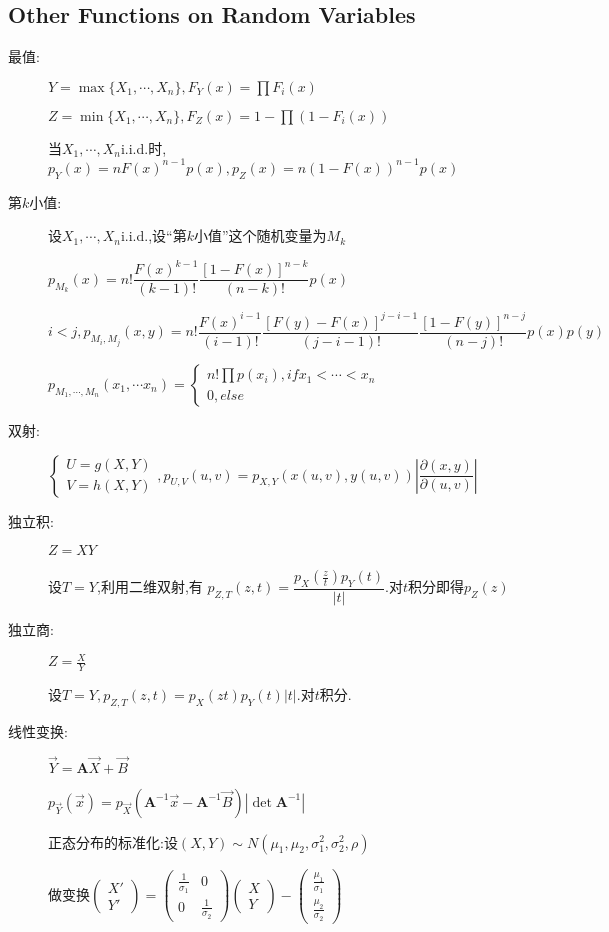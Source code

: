 \subsection{Other Functions on Random Variables}
\begin{description}
  \item[最值:]
    $ Y=\max\{ X_1,\cdots, X_n\}, F_Y(x) = \prod{F_i(x)}$

    $ Z = \min\{ X_1,\cdots ,X_n\}, F_Z(x) = 1-\prod{(1-F_i(x))}$

    当$ X_1,\cdots ,X_n$i.i.d.时,$ p_Y(x)=nF(x)^{n-1}p(x), p_Z(x)=n(1-F(x))^{n-1}p(x)$
  \item[第$ k$小值:]设$ X_1,\cdots ,X_n$i.i.d.,设``第$ k$小值''这个随机变量为$ M_k$

      $ p_{M_k}(x)=n!\dfrac{F(x)^{k-1}}{(k-1)!}\dfrac{[1-F(x)]^{n-k}}{(n-k)!}p(x)$

      $i<j, p_{M_i,M_j}(x,y)=n!\dfrac{F(x)^{i-1}}{(i-1)!}\dfrac{[F(y)-F(x)]^{j-i-1}}{(j-i-1)!}\dfrac{[1-F(y)]^{n-j}}{(n-j)!}p(x)p(y)$

      $ p_{M_1,\cdots ,M_n}(x_1,\cdots x_n)=\begin{cases}n!\prod{p(x_i)},if x_1<\cdots <x_n\\0,else \end{cases}$
  \item[双射:]
   $ \begin{cases}U=g(X,Y)\\V=h(X,Y)\end{cases},p_{U,V}(u,v) = p_{X,Y}(x(u,v),y(u,v))|\dfrac{\partial(x,y)}{\partial(u,v)}|$

  \item[独立积:]$ Z=XY$\hfill

   设$T = Y$,利用二维双射,有 $p_{Z,T}(z,t) = \dfrac{p_X(\frac{z}{t})p_Y(t)}{|t|}$.对$ t$积分即得$ p_Z(z)$

 \item[独立商:]$ Z=\frac{X}{Y}$\hfill

   设$ T=Y,p_{Z,T}(z,t)=p_X(zt)p_Y(t)|t|.$对$ t$积分.

 \item[线性变换:]$ \vec Y = \mathbf{A} \vec X + \vec B$

   $ p_{\vec Y}(\vec x)=p_{\vec X}(\mathbf{A}^{-1}\vec x-\mathbf{A}^{-1}\vec B)|\det \mathbf{A}^{-1}|$

   正态分布的标准化:设$(X,Y)\sim N(\mu_1,\mu_2,\sigma_1^2,\sigma_2^2,\rho) $

   做变换$\begin{pmatrix} X'\\Y'\end{pmatrix}=\begin{pmatrix}\frac{1}{\sigma_1}&0\\0&\frac{1}{\sigma_2}
   \end{pmatrix}\begin{pmatrix}X\\Y\end{pmatrix}-\begin{pmatrix}\frac{\mu_1}{\sigma_1}\\\frac{\mu_2}{\sigma_2}\end{pmatrix}$


\end{description}
